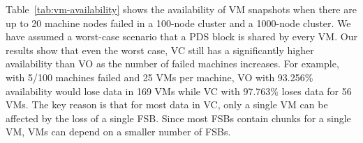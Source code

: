  Table~\ref{tab:vm-availability} shows the availability of VM snapshots when 
there are up to 20 machine nodes failed in a 100-node cluster and  a 1000-node cluster. 
We have assumed a worst-case scenario that  a PDS block is shared by every VM. 
Our results show that even the worst case,  VC  still has a significantly  higher availability than VO as the number of
failed machines increases.
For example, with 5/100 machines failed and 25 VMs per machine, VO with 93.256\% availability would lose data in 169 VMs 
while VC with 97.763\% loses data for 56 VMs.
The key reason is that for most data in VC, only a single
VM can be affected by the loss of a single FSB. Since most FSBs contain chunks for a single VM, VMs can depend on a smaller number of FSBs.

